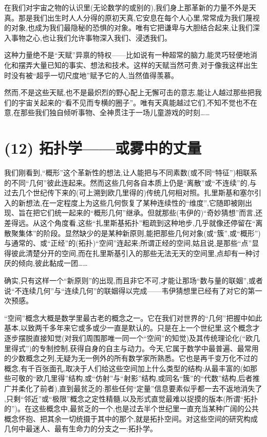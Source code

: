 在我们对宇宙之物的认识里(无论数学的或别的),我们身上那革新的力量不外是天真。那是我们出生时人人分得的原初天真,它安息在每个人心里,常常成为我们蔑视的对象,也成为我们最隐秘的恐惧的对象。唯有它把谦卑与大胆结合起来,让我们深入事物之心,也让我们允许事物深入我们、浸透我们。

这种力量绝不是“天赋”异禀的特权——比如说有一种超常的脑力,能灵巧轻便地消化和摆弄大量已知的事实、想法和技术。这样的天赋当然可贵,对于像我这样出生时没有被“超乎一切尺度地”赋予它的人,当然值得羡慕。

然而,不是这些天赋,也不是最炽烈的野心配上无懈可击的意志,能让人越过那些把我们的宇宙关起来的“看不见而专横的圈子”。唯有天真能越过它们,不知不觉也不在意,在那些我们独自倾听事物、全神贯注于一场儿童游戏的时刻……

\section{(12) 拓扑学——或雾中的丈量}

我们刚看到,“概形”这个革新性的想法,让人能把与不同素数(或不同“特征”)相联系的不同“几何”彼此连起来。然而这些几何各自本质上仍是“离散”或“不连续”的,与过去几个世纪传下来的(可上溯到欧几里得的)传统几何相对照。扎里斯基和塞尔引入的新想法,在一定程度上为这些几何恢复了某种连续性的“维度”,它随即被刚出现、旨在把它们统一起来的“概形几何”继承。但就那些(韦伊的)“奇妙猜想”而言,还差得远。从这个角度看,这些“扎里斯基拓扑”粗疏到这种地步,几乎就像还停留在“离散聚集体”的阶段。显然缺少的是某种新原则,能把那些几何对象(或“簇”,或“概形”)与通常的、或“正经”的(拓扑)“空间”连起来;所谓正经的空间,姑且说,是那些“点”显得彼此清楚分开的空间,而在扎里斯基引入的那些无法无天的空间里,点却有一种讨厌的倾向,彼此黏成一团……

确实,只有这样一个“新原则”的出现,而且非它不可,才能让那场“数与量的联姻”,或者说“不连续几何”与“连续几何”的联姻得以完成——韦伊猜想里已经有了对它的第一次预感。

“空间”概念大概是数学里最古老的概念之一。它在我们对世界的“几何”把握中如此基本,以致两千多年来它或多或少一直是默认的。只是在上一个世纪里,这个概念才逐步摆脱直接知觉(对我们周围那唯一同一个“空间”的知觉)及其传统理论化(“欧几里得式”)的专制控制,获得自身的自主与动力。今天,它属于数学中最普遍、最常用的少数概念之列,无疑为无一例外的所有数学家所熟悉。它也是再千变万化不过的概念,有千百张面孔,取决于人们给这些空间加上什么类型的结构:从最丰富的(如那些可敬的“欧几里得”结构,或“仿射”与“射影”结构,或同名“簇”的“代数”结构,后者推广并柔化了前者),直到最贫乏的:那些任何“定量”信息要素似乎都一去不返地消失了
,只剩“邻近”或“极限”概念之定性精髓,以及形式直觉最难以捉摸的版本(所谓“拓扑的”)。在这些概念中,最贫乏的一个,也是过去半个世纪里一直充当某种广阔的公共概念怀抱、把其余一切统摄于其中的那个,就是拓扑空间。对这些空间的研究构成几何中最迷人、最有生命力的分支之一:拓扑学。

